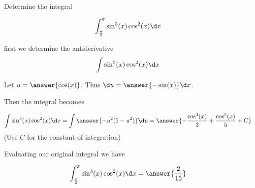 \documentclass{ximera}
\author{Jason Miller}
\begin{document}
\begin{exercise}
Determine the integral

\[
\int_{\frac{\pi}{2}}^{\pi} \sin^{3}(x)\cos^{2}(x) \d x
\]

first we determine the antiderivative
\[
\int \sin^{3}(x)\cos^{2}(x) \d x
\]

Let $u=\answer{ \cos(x)}$. Thus $\d u = \answer{ -\sin(x)} \d x$.

\begin{exercise}
Then the integral becomes

\[ 
\int \sin^{3}(x) \cos^{2}(x) \d x= \int \answer{- u^{2}(1-u^{2}) } \d u= \answer{ -\frac{ \cos^{3}(x)}{3} + \frac{ \cos^{5}(x)}{5} +C  }
\]
(Use $C$ for the constant of integration)

\begin{exercise}
Evaluating our original integral we have

\[
\int_{\frac{ \pi}{2}}^{\pi} \sin^{3}(x) \cos^{2}(x) \d x= \answer { \frac{2}{15} }
\]



\end{exercise}
\end{exercise}
\end{exercise}
\end{document}
